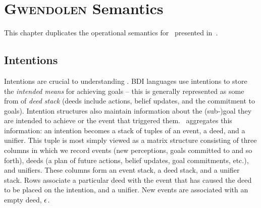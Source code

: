 \chapter{\textsc{Gwendolen} Semantics}
\label{chap:gwendolen_semantics}
%

This chapter duplicates the operational semantics for \gwendolen\ 
presented in~\cite{dennis17gwen}.

\section{Intentions}
\label{sec:intentions}

Intentions are crucial to understanding \gwendolen.  BDI languages use intentions to
store the \emph{intended means} for achieving goals -- this is
generally represented as some from of {\em deed stack} (deeds include
actions, belief updates, and the commitment to
goals).  Intention structures 
also maintain information about the (sub-)goal they are intended to
achieve or the event that triggered them. \gwendolen\ aggregates
this information: an intention becomes a stack of tuples of an
event, a deed, and a
unifier.  This tuple is most
simply viewed as a matrix structure consisting of three columns in
which we record events (new perceptions, goals committed to and so
forth), deeds (a plan of future actions, belief updates, goal
commitments, etc.), and unifiers. These columns form an event stack, a deed
stack, and a unifier stack.  Rows associate a
particular deed with the event that has caused the deed to be placed
on the intention, and a unifier. New events are associated with an empty
deed, $\AILnpy$\index{$\AILnpy$}\index{empty deed}\index{no plan yet}.

